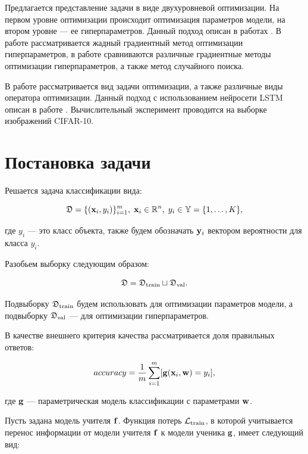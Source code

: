 \documentclass[12pt, twoside]{article}
\begin{document}
Предлагается представление задачи в виде двухуровневой оптимизации. На первом уровне оптимизации происходит оптимизация параметров модели, на втором уровне --- ее гиперпараметров. Данный подход описан в работах \cite{journals/corr/LuketinaBR15, journals/anor/BakhteevS20, journals/corr/MaclaurinDA15}. В работе \cite{journals/corr/LuketinaBR15} рассматривается жадный градиентный метод оптимизации гиперпараметров, в работе \cite{journals/anor/BakhteevS20} сравниваются различные градиентные методы оптимизации гиперпараметров, а также метод случайного поиска.

В работе рассматривается вид задачи оптимизации, а также различные виды оператора оптимизации. Данный подход с использованием нейросети LSTM описан в работе \cite{journals/corr/AndrychowiczDGH16}. Вычислительный эксперимент проводится на выборке изображений CIFAR-10.

\section{Постановка задачи}
Решается задача классификации вида:

\begin{equation} \label{eq:data}
    \fD = \{(\bx_i, y_i)\}_{i=1}^{m},\; \bx_i \in \bbR^n,\; y_i \in \bbY = \{1, \dots, K\},
\end{equation}

\noindent
где $y_i$ — это класс объекта, также будем обозначать $\mathbf{y}_i$ вектором вероятности для
класса $y_i$.

Разобьем выборку следующим образом:

\begin{equation} \label{eq:split}
    \fD = \fD_\text{train} \sqcup \fD_\text{val}.
\end{equation}

Подвыборку $\mathfrak{D}_\text{train}$ будем использовать для оптимизации параметров модели, а подвыборку $\mathfrak{D}_\text{val}$ --- для оптимизации гиперпараметров.

В качестве внешнего критерия качества рассматривается доля правильных ответов:

\begin{equation} \label{eq:accuracy}
    accuracy = \frac{1}{m}\sum\limits_{i=1}^m [\bg(\bx_i, \bw) = y_i],
\end{equation}

\noindent
где $\mathbf{g}$ --- параметрическая модель классификации с параметрами $\mathbf{w}$.

Пусть задана модель учителя $\mathbf{f}$. Функция потерь $\mathcal{L}_\text{train}$, в которой учитывается перенос информации от модели учителя $\mathbf{f}$ к модели ученика $\mathbf{g}$, имеет следующий вид:
\end{document}
